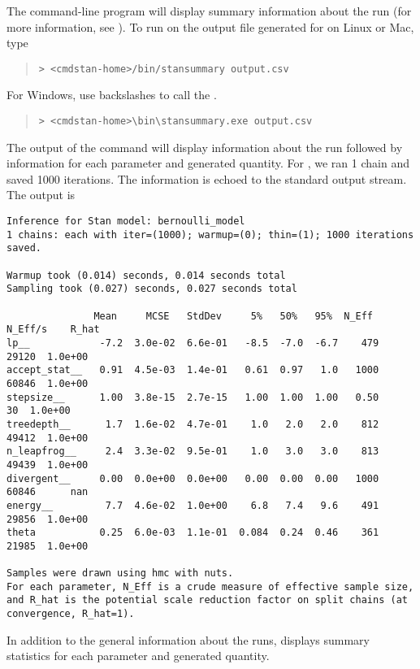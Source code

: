 The command-line program  will display summary
information about the run (for more information, see
). To run  on the output file
generated for  on Linux or Mac, type
%
\begin{quote}
\begin{Verbatim}[fontshape=sl]
> <cmdstan-home>/bin/stansummary output.csv
\end{Verbatim}
\end{quote}
%
For Windows, use backslashes to call the .
%
\begin{quote}
\begin{Verbatim}[fontshape=sl]
> <cmdstan-home>\bin\stansummary.exe output.csv
\end{Verbatim}
\end{quote}
%
The output of the command will display information about the run
followed by information for each parameter and generated quantity. For
, we ran 1 chain and saved 1000 iterations. The
information is echoed to the standard output stream. The output is
%
\begin{Verbatim}[fontsize=\footnotesize]
Inference for Stan model: bernoulli_model
1 chains: each with iter=(1000); warmup=(0); thin=(1); 1000 iterations saved.

Warmup took (0.014) seconds, 0.014 seconds total
Sampling took (0.027) seconds, 0.027 seconds total

               Mean     MCSE   StdDev     5%   50%   95%  N_Eff  N_Eff/s    R_hat
lp__            -7.2  3.0e-02  6.6e-01   -8.5  -7.0  -6.7    479    29120  1.0e+00
accept_stat__   0.91  4.5e-03  1.4e-01   0.61  0.97   1.0   1000    60846  1.0e+00
stepsize__      1.00  3.8e-15  2.7e-15   1.00  1.00  1.00   0.50       30  1.0e+00
treedepth__      1.7  1.6e-02  4.7e-01    1.0   2.0   2.0    812    49412  1.0e+00
n_leapfrog__     2.4  3.3e-02  9.5e-01    1.0   3.0   3.0    813    49439  1.0e+00
divergent__     0.00  0.0e+00  0.0e+00   0.00  0.00  0.00   1000    60846      nan
energy__         7.7  4.6e-02  1.0e+00    6.8   7.4   9.6    491    29856  1.0e+00
theta           0.25  6.0e-03  1.1e-01  0.084  0.24  0.46    361    21985  1.0e+00

Samples were drawn using hmc with nuts.
For each parameter, N_Eff is a crude measure of effective sample size,
and R_hat is the potential scale reduction factor on split chains (at
convergence, R_hat=1).
\end{Verbatim}
%
In addition to the general information about the runs, 
displays summary statistics for each parameter and generated
quantity.

